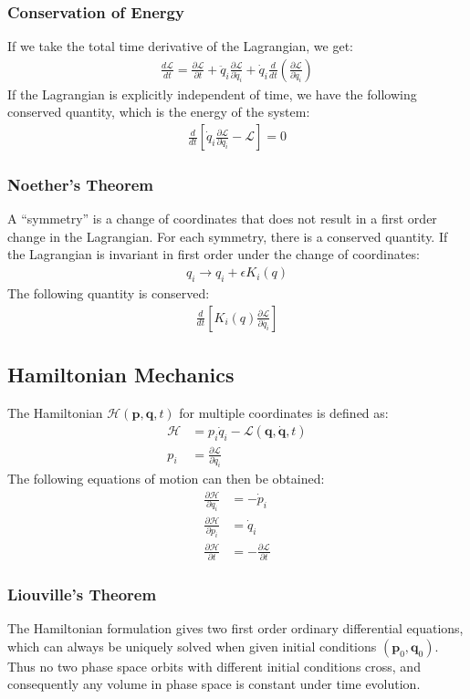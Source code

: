 \documentclass[11pt, letterpaper]{article}
\newcommand{\Lagr}{\mathcal{L}}	       %
\newcommand{\Hami}{\mathcal{H}}	       %
\newcommand{\ve}[1]{
  \ensuremath{\bm{#1}}}	               %
\newcommand{\pd}[2]{
  \ensuremath{
    \frac{\partial #1}{\partial #2} }} %
\begin{document}
\begin{multicols*}{3}
\subsubsection{Conservation of Energy}
If we take the total time derivative of the Lagrangian, we get:
\begin{align*}
  \frac{d\Lagr}{dt} = \pd{\Lagr}{t} + \ddot{q}_i\pd{\Lagr}{\dot{q}_i} +
  \dot{q}_i \frac{d}{dt} \left( \pd{\Lagr}{\dot{q}_i} \right)  
\end{align*}
If the Lagrangian is explicitly independent of time, we have the following conserved quantity, which is the energy of the system:
\begin{align*}
  \frac{d}{dt} \left[ \dot{q}_i \pd{\Lagr}{\dot{q}_i} - \Lagr \right] = 0
\end{align*}
\subsubsection{Noether's Theorem}
A ``symmetry'' is a change of coordinates that does not result in a first order
change in the Lagrangian. For each symmetry, there is a conserved quantity. If
the Lagrangian is invariant in first order under the change of coordinates:
\begin{align*}
  q_i \rightarrow q_i + \epsilon K_i (q)
\end{align*}
The following quantity is conserved:
\begin{align*}
  \frac{d}{dt} \left[ K_i(q) \pd{\Lagr}{\dot{q_i}} \right]
\end{align*}
\subsection{Hamiltonian Mechanics}
The Hamiltonian $\Hami(\ve{p},\ve{q},t)$ for multiple coordinates is defined as:
\begin{align*}
  \Hami &= p_i \dot{q}_i - \Lagr(\ve{q}, \dot{\ve{q}}, t) \\
  p_i &= \pd{\Lagr}{\dot{q}_i}
\end{align*}
The following equations of motion can then be obtained:
\begin{align*}
  \pd{\Hami}{q_i} &= -\dot{p}_i \\
  \pd{\Hami}{p_i} &= \dot{q}_i \\
  \pd{\Hami}{t} &= - \pd{\Lagr}{t}
\end{align*}
\subsubsection{Liouville's Theorem}
The Hamiltonian formulation gives two first order ordinary differential
equations, which can always be uniquely solved when given initial conditions
$(\ve{p}_0, \ve{q}_0)$. Thus no two phase space orbits with different initial
conditions cross, and consequently any volume in phase space is constant under
time evolution.

\end{multicols*}
\end{document}
